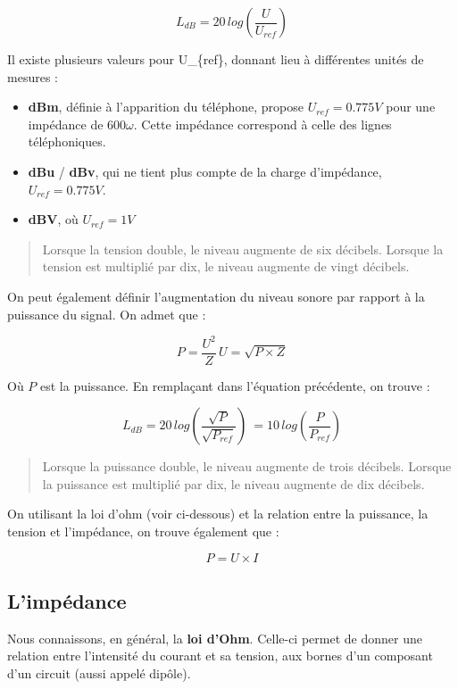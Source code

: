 \documentclass[
]{book}
\providecommand{\tightlist}{%
  \setlength{\itemsep}{0pt}\setlength{\parskip}{0pt}}
\begin{document}
\[ L_{dB} = 20 \, log (\frac{U}{U_{ref}}) \]

Il existe plusieurs valeurs pour U\_\{ref\}, donnant lieu à différentes unités de mesures :

\begin{itemize}
\tightlist
\item
  \textbf{dBm}, définie à l'apparition du téléphone, propose \(U_{ref} = 0.775 V\) pour une impédance de \(600 \omega\). Cette impédance correspond à celle des lignes téléphoniques.
\item
  \textbf{dBu} / \textbf{dBv}, qui ne tient plus compte de la charge d'impédance, \(U_{ref} = 0.775 V\).
\item
  \textbf{dBV}, où \(U_{ref} = 1 V\)
\end{itemize}

\begin{quote}
Lorsque la tension double, le niveau augmente de six décibels. Lorsque la tension est multiplié par dix, le niveau augmente de vingt décibels.
\end{quote}

On peut également définir l'augmentation du niveau sonore par rapport à la puissance du signal. On admet que :

\[ P = \frac{U^2}{Z} \, U = \sqrt{P \times Z} \]

Où \(P\) est la puissance. En remplaçant dans l'équation précédente, on trouve :

\[ L_{dB} = 20 \, log (\frac{\sqrt{P}}{\sqrt{P_{ref}}}) \> = 10 \, log (\frac{P}{P_{ref}}) \]

\begin{quote}
Lorsque la puissance double, le niveau augmente de trois décibels. Lorsque la puissance est multiplié par dix, le niveau augmente de dix décibels.
\end{quote}

On utilisant la loi d'ohm (voir ci-dessous) et la relation entre la puissance, la tension et l'impédance, on trouve également que :

\[ P = U \times I \]

\hypertarget{limpuxe9dance}{%
\subsection{L'impédance}\label{limpuxe9dance}}

Nous connaissons, en général, la \textbf{loi d'Ohm}. Celle-ci permet de donner une relation entre l'intensité du courant et sa tension, aux bornes d'un composant d'un circuit (aussi appelé dipôle).
\end{document}
